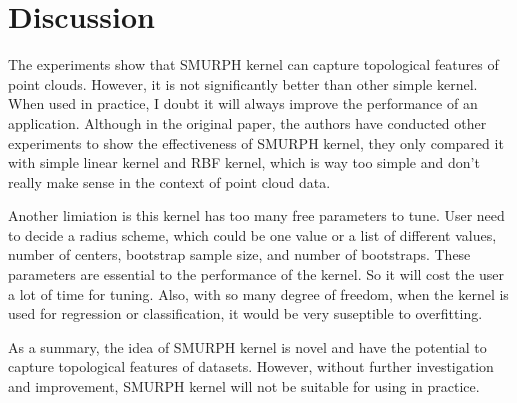 \documentclass[10pt]{article}
\begin{document}

\section{Discussion}
The experiments show that SMURPH kernel can capture topological features of point clouds.
However, it is not significantly better than other simple kernel.
When used in practice, I doubt it will always improve the performance of an application.
Although in the original paper, the authors have conducted other experiments to show the
effectiveness of SMURPH kernel, they only compared it with simple linear kernel and RBF kernel,
which is way too simple and don't really make sense in the context of point cloud data.

Another limiation is this kernel has too many free parameters to tune.
User need to decide a radius scheme, which could be one value or a list of different values, number of centers, bootstrap sample size, and number of bootstraps.
These parameters are essential to the performance of the kernel.
So it will cost the user a lot of time for tuning.
Also, with so many degree of freedom, when the kernel is used for regression or classification,
it would be very suseptible to overfitting.

As a summary, the idea of SMURPH kernel is novel and have the potential to capture topological features of datasets.
However, without further investigation and improvement, SMURPH kernel will not be suitable for using in practice.



\end{document}
